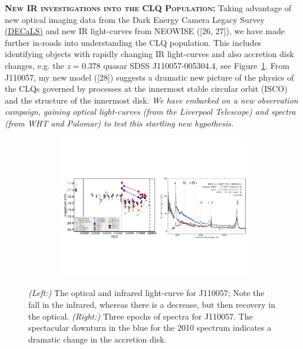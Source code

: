 \documentclass[oneside, a4paper, onecolumn, 11pt]{article}
\begin{document}
\smallskip \smallskip
\smallskip
\smallskip
\noindent
\textbf{\textsc{New IR investigations into the CLQ Population:}}
Taking advantage of new optical imaging data from the Dark Energy
Camera Legacy Survey \href{http://legacysurvey.org/decamls/}{(DECaLS)}
and new IR light-curves from NEOWISE ([26, 27]), we have made further
in-roads into understanding the CLQ population. This includes
identifying objects with rapidly changing IR light-curves and also
accretion disk changes, e.g. the $z=0.378$ quasar SDSS
J110057-005304.4, see Figure~\ref{fig:J110057}. From J110057, my new
model ([28]) suggests a dramatic new picture of the physics of the
CLQs governed by processes at the innermost stable circular orbit
(ISCO) and the structure of the innermost disk. {\it We have embarked
on a new observation campaign, gaining optical light-curves (from the
Liverpool Telescope) and spectra (from WHT and Palomar) to test this
startling new hypothesis.}
\begin{figure}[h]
  \begin{center}
    \hspace{-0.5cm}
    \includegraphics[height=6.25cm,width=17.2cm]
    {figures/J110057_LC_Spectra_20171024.pdf}
    \vspace{-10pt}
    \caption{%
      \footnotesize 
      {\it (Left:)} The optical and infrared light-curve for J110057; 
      Note the fall in the infrared, whereas there is a decrease, but 
      then recovery in the optical. 
      {\it (Right:)} 
      Three epochs of spectra for J110057. 
      The spectacular downturn in the blue for the 2010 spectrum 
      indicates a dramatic change in the accretion disk.
    }
  \vspace{-16pt}
 \label{fig:J110057}
\end{center}
\end{figure}
\end{document}

